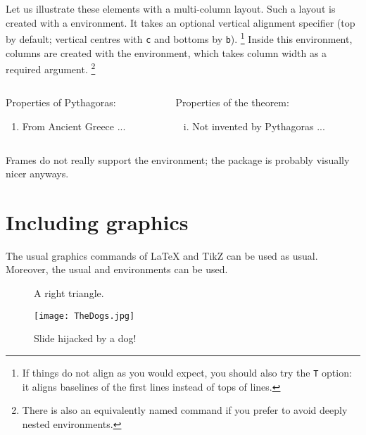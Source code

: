 Let us illustrate these elements with a multi-column layout.
Such a layout is created with a  environment.
It takes an optional vertical alignment specifier (top by default;
vertical centres with \verb|c| and bottoms by \verb|b|).%
\footnote{If things do not align as you would expect,
you should also try the \texttt{T} option:
it aligns baselines of the first lines instead of tops of lines.}
%
Inside this environment, columns are created with the  environment,
which takes column width as a required argument.%
\footnote{There is also an equivalently named command
if you prefer to avoid deeply nested environments.}
%
\begin{ExampleCode}
\begin{columns}
\begin{column}{0.5\textwidth}

Properties of \alert{Pythagoras}:
\begin{enumerate}[1.]
    \item From Ancient Greece ...
\end{enumerate}
\end{column}

\begin{column}{0.5\textwidth}
Properties of \alert{the theorem}:
\begin{enumerate}[i)]
    \item Not invented by Pythagoras ...
\end{enumerate}

\end{column}
\end{columns}
\end{ExampleCode}
%


\begin{gotcha}
Frames do not really support the  environment;
the  package is probably visually nicer anyways.
\end{gotcha}


%
%
\section{Including graphics}

The usual graphics commands of \LaTeX{} and TikZ can be used as usual.
Moreover, the usual  and  environments can be used.
%
\begin{ExampleCode}
\begin{figure}
\caption{A right triangle.}
\end{figure}

\begin{figure}
    \texttt{[image: TheDogs.jpg]}
\caption{Slide hijacked by a dog!}
\end{figure}
\end{ExampleCode}
%


